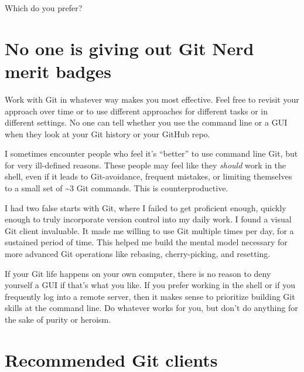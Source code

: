 \documentclass[
]{book}
\begin{document}
Which do you prefer?

\section{No one is giving out Git Nerd merit badges}\label{no-one-is-giving-out-git-nerd-merit-badges}

Work with Git in whatever way makes you most effective.
Feel free to revisit your approach over time or to use different approaches for different tasks or in different settings.
No one can tell whether you use the command line or a GUI when they look at your Git history or your GitHub repo.

I sometimes encounter people who feel it's ``better'' to use command line Git, but for very ill-defined reasons.
These people may feel like they \emph{should} work in the shell, even if it leads to Git-avoidance, frequent mistakes, or limiting themselves to a small set of \textasciitilde3 Git commands.
This is counterproductive.

I had two false starts with Git, where I failed to get proficient enough, quickly enough to truly incorporate version control into my daily work.
I found a visual Git client invaluable.
It made me willing to use Git multiple times per day, for a sustained period of time.
This helped me build the mental model necessary for more advanced Git operations like rebasing, cherry-picking, and resetting.

If your Git life happens on your own computer, there is no reason to deny yourself a GUI if that's what you like.
If you prefer working in the shell or if you frequently log into a remote server, then it makes sense to prioritize building Git skills at the command line.
Do whatever works for you, but don't do anything for the sake of purity or heroism.

\section{Recommended Git clients}\label{recommended-git-clients}
\end{document}
